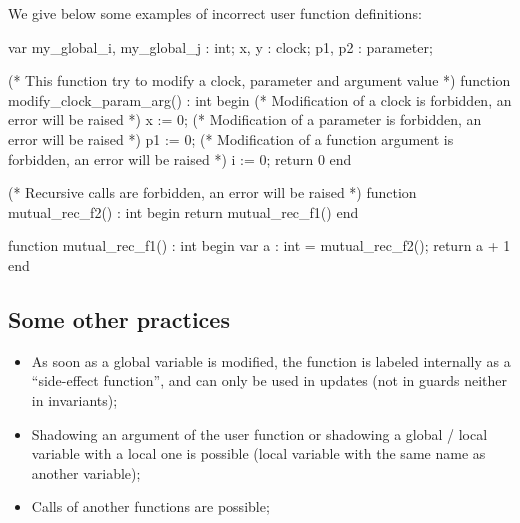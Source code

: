 \begin{example}
We give below some examples of incorrect user function definitions:

\begin{IMITATORmodel}
	var
	my_global_i, my_global_j : int;
	x, y : clock;
	p1, p2 : parameter;

	(* This function try to modify a clock, parameter and argument value *)
	function modify_clock_param_arg() : int
	begin
		(* Modification of a clock is forbidden, an error will be raised *)
		x := 0;
		(* Modification of a parameter is forbidden, an error will be raised *)
		p1 := 0;
		(* Modification of a function argument is forbidden, an error will be raised *)
		i := 0;
		return 0
	end

	(* Recursive calls are forbidden, an error will be raised *)
	function mutual_rec_f2() : int
	begin
		return mutual_rec_f1()
	end

	function mutual_rec_f1() : int
	begin
		var a : int = mutual_rec_f2();
		return a + 1
	end

\end{IMITATORmodel}
\end{example}

\subsection{Some other practices}

\begin{itemize}
\item As soon as a global variable is modified, the function is labeled internally as a ``side-effect function'', and can only be used in updates (not in guards neither in invariants);
\item Shadowing an argument of the user function or shadowing a global / local variable with a local one is possible (local variable with the same name as another variable);
\item Calls of another functions are possible;
\end{itemize}

